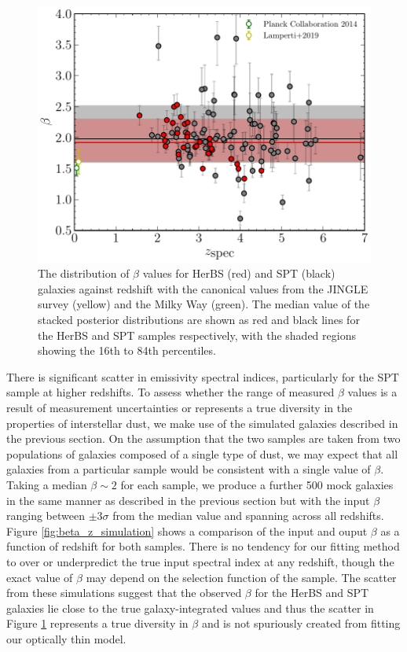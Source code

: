 \begin{figure}
	\centering
	\includegraphics[width=0.75\columnwidth]{Figures/beta_evolution.pdf}
	\caption{The distribution of $\beta$ values for HerBS (red) and SPT (black) galaxies against redshift with the canonical values from the JINGLE survey (yellow) and the Milky Way (green). The median value of the stacked posterior distributions are shown as red and black lines for the HerBS and SPT samples respectively, with the shaded regions showing the 16th to 84th percentiles.}
	\label{fig:beta_z_evolution}
\end{figure}

There is significant scatter in emissivity spectral indices, particularly for the SPT sample at higher redshifts. To assess whether the range of measured $\beta$ values is a result of measurement uncertainties or represents a true diversity in the properties of interstellar dust, we make use of the simulated galaxies described in the previous section. On the assumption that the two samples are taken from two populations of galaxies composed of a single type of dust, we may expect that all galaxies from a particular sample would be consistent with a single value of $\beta$. Taking a median $\beta \sim 2$ for each sample, we produce a further {\color{red} 500} mock galaxies in the same manner as described in the previous section but with the input $\beta$ ranging between $\pm 3\sigma$ from the median value and spanning across all redshifts. Figure \ref{fig:beta_z_simulation} shows a comparison of the input and ouput $\beta$ as a function of redshift for both samples. There is no tendency for our fitting method to over or underpredict the true input spectral index at any redshift, though the exact value of $\beta$ may depend on the selection function of the sample. The scatter from these simulations suggest that the observed $\beta$ for the HerBS and SPT galaxies lie close to the true galaxy-integrated values and thus the scatter in Figure \ref{fig:beta_z_evolution} represents a true diversity in $\beta$ and is not spuriously created from fitting our optically thin model.

